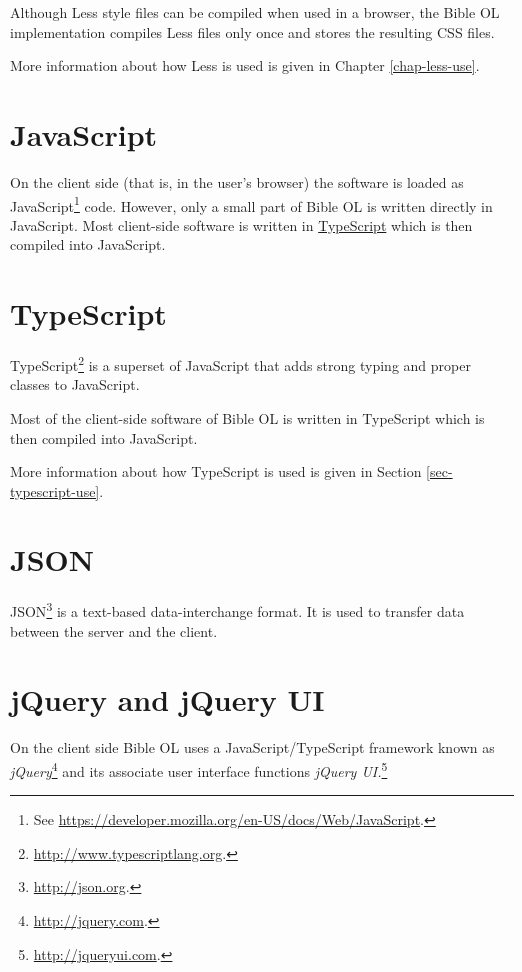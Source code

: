\documentclass[11pt,oneside,a4paper]{memoir}
\begin{document}
Although Less style files can be compiled when used in a browser, the Bible OL implementation
compiles Less files only once and stores the resulting CSS files.

More information about how Less is used is given in Chapter \ref{chap-less-use}.

\section{JavaScript}

On the client side (that is, in the user's browser) the software is loaded as
JavaScript\footnote{See \url{https://developer.mozilla.org/en-US/docs/Web/JavaScript}.} code.
However, only a small part of Bible OL is written directly in JavaScript. Most client-side software
is written in \hyperref[sec-typescript]{TypeScript} which is then compiled into JavaScript.

\section{TypeScript}\label{sec-typescript}

TypeScript\footnote{\url{http://www.typescriptlang.org}.} is a superset of JavaScript that adds
strong typing and proper classes to JavaScript.

Most of the client-side software of Bible OL is written in TypeScript which is then compiled into
JavaScript.

More information about how TypeScript is used is given in Section
\ref{sec-typescript-use}.

\section{JSON}

JSON\footnote{\url{http://json.org}.} is a text-based data-interchange format. It is used to
transfer data between the server and the client.

\section{jQuery and jQuery UI}

On the client side Bible OL uses a JavaScript/TypeScript framework known as
\emph{jQuery}\footnote{\url{http://jquery.com}.} and its associate user interface functions
\emph{jQuery UI.}\footnote{\url{http://jqueryui.com}.}
\end{document}
